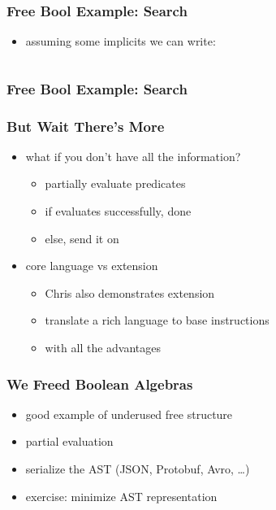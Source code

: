 \documentclass{beamer}
\begin{document}
\begin{frame}
  \frametitle{Free Bool Example: Search}
  \begin{itemize}
  \item assuming some implicits we can write:
  \end{itemize}
  \inputminted{scala}{snippets/example-search-predicate.scala}
\end{frame}

\begin{frame}
  \frametitle{Free Bool Example: Search}
\end{frame}

\begin{frame}
  \frametitle{But Wait There's More}
  \begin{itemize}
  \item what if you don't have all the information?
    \begin{itemize}
    \item partially evaluate predicates
    \item if evaluates successfully, done
    \item else, send it on
    \end{itemize}
  \item core language vs extension
    \begin{itemize}
    \item Chris also demonstrates extension
    \item translate a rich language to base instructions
    \item with all the advantages
    \end{itemize}
  \end{itemize}
\end{frame}

\begin{frame}
  \frametitle{We Freed Boolean Algebras}
  \begin{itemize}
  \item good example of underused free structure
  \item partial evaluation
  \item serialize the AST (JSON, Protobuf, Avro, \ldots{})
  \item exercise: minimize AST representation
  \end{itemize}
\end{frame}
\end{document}
